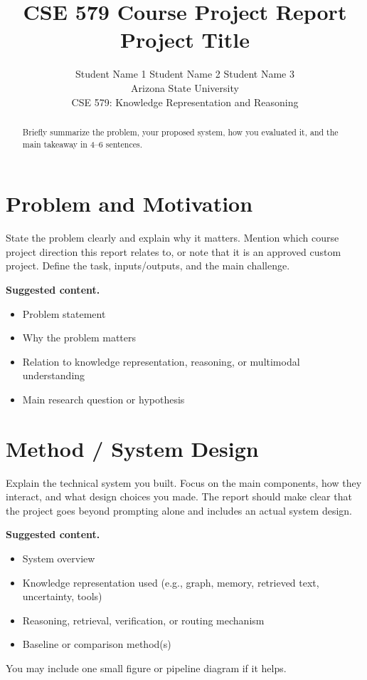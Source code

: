 \documentclass{article}
\title{CSE 579 Course Project Report\\[0.2em]
\large Project Title}
\author{%
Student Name 1 \quad Student Name 2 \quad Student Name 3 \\
Arizona State University \\
CSE 579: Knowledge Representation and Reasoning
}
\begin{document}
\maketitle

\begin{abstract}
Briefly summarize the problem, your proposed system, how you evaluated it, and the
main takeaway in 4--6 sentences.
\end{abstract}

\section{Problem and Motivation}
State the problem clearly and explain why it matters. Mention which course project
direction this report relates to, or note that it is an approved custom project.
Define the task, inputs/outputs, and the main challenge.

\textbf{Suggested content.}
\begin{itemize}
    \item Problem statement
    \item Why the problem matters
    \item Relation to knowledge representation, reasoning, or multimodal understanding
    \item Main research question or hypothesis
\end{itemize}

\section{Method / System Design}
Explain the technical system you built. Focus on the main components, how they
interact, and what design choices you made. The report should make clear that the
project goes beyond prompting alone and includes an actual system design.

\textbf{Suggested content.}
\begin{itemize}
    \item System overview
    \item Knowledge representation used (e.g., graph, memory, retrieved text, uncertainty, tools)
    \item Reasoning, retrieval, verification, or routing mechanism
    \item Baseline or comparison method(s)
\end{itemize}

You may include one small figure or pipeline diagram if it helps.
\end{document}
